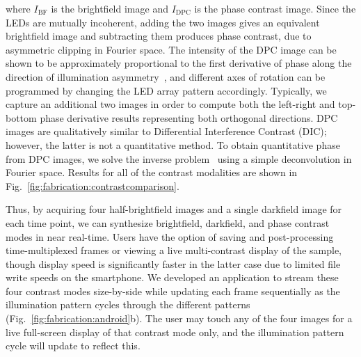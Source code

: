 \noindent where $I_{\mathrm{BF}}$ is the brightfield image and $I_{\mathrm{DPC}}$ is the phase contrast image. Since the LEDs are mutually incoherent, adding the two images gives an equivalent brightfield image and subtracting them produces phase contrast, due to asymmetric clipping in Fourier space. The intensity of the DPC image can be shown to be approximately proportional to the first derivative of phase along the direction of illumination asymmetry~\cite{Hamilton1984a}, and different axes of rotation can be programmed by changing the LED array pattern accordingly. Typically, we capture an additional two images in order to compute both the left-right and top-bottom phase derivative results representing both orthogonal directions. DPC images are qualitatively similar to Differential Interference Contrast (DIC); however, the latter is not a quantitative method. To obtain quantitative phase from DPC images, we solve the inverse problem~\cite{mehta2009quantitative,tian20153d} using a simple deconvolution in Fourier space. Results for all of the contrast modalities are shown in Fig.~\ref{fig:fabrication:contrastcomparison}.

Thus, by acquiring four half-brightfield images and a single darkfield image for each time point, we can synthesize brightfield, darkfield, and phase contrast modes in near real-time. Users have the option of saving and post-processing time-multiplexed frames or viewing a live multi-contrast display of the sample, though display speed is significantly faster in the latter case due to limited file write speeds on the smartphone. We developed an application to stream these four contrast modes size-by-side while updating each frame sequentially as the illumination pattern cycles through the different patterns (Fig.~\ref{fig:fabrication:android}b). The user may touch any of the four images for a live full-screen display of that contrast mode only, and the illumination pattern cycle will update to reflect this.

